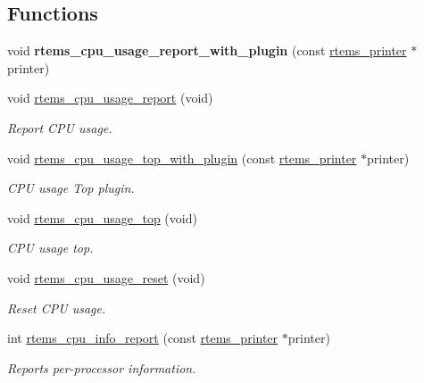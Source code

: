 \subsection*{Functions}
\begin{DoxyCompactItemize}
\item 
\mbox{\label{group__libmisc__cpuuse_ga848ef3a820832a30320d3fe4ab710e3d}} 
void {\bfseries rtems\+\_\+cpu\+\_\+usage\+\_\+report\+\_\+with\+\_\+plugin} (const \mbox{\hyperlink{structrtems__printer}{rtems\+\_\+printer}} $\ast$printer)
\item 
void \mbox{\hyperlink{group__libmisc__cpuuse_gadb8847280947582f897b8b544dee213f}{rtems\+\_\+cpu\+\_\+usage\+\_\+report}} (void)
\begin{DoxyCompactList}\small\item\em Report C\+PU usage. \end{DoxyCompactList}\item 
void \mbox{\hyperlink{group__libmisc__cpuuse_gacd408d05bbbb31991311a6b90ef0b0a8}{rtems\+\_\+cpu\+\_\+usage\+\_\+top\+\_\+with\+\_\+plugin}} (const \mbox{\hyperlink{structrtems__printer}{rtems\+\_\+printer}} $\ast$printer)
\begin{DoxyCompactList}\small\item\em C\+PU usage Top plugin. \end{DoxyCompactList}\item 
void \mbox{\hyperlink{group__libmisc__cpuuse_ga19ebbbc28253558959a17de6992d0ef2}{rtems\+\_\+cpu\+\_\+usage\+\_\+top}} (void)
\begin{DoxyCompactList}\small\item\em C\+PU usage top. \end{DoxyCompactList}\item 
void \mbox{\hyperlink{group__libmisc__cpuuse_gac38d4e3385e0c7307035d828e74ace97}{rtems\+\_\+cpu\+\_\+usage\+\_\+reset}} (void)
\begin{DoxyCompactList}\small\item\em Reset C\+PU usage. \end{DoxyCompactList}\item 
int \mbox{\hyperlink{group__libmisc__cpuuse_gaf6abf25be4a36f4f36e44b9b5bedb6d5}{rtems\+\_\+cpu\+\_\+info\+\_\+report}} (const \mbox{\hyperlink{structrtems__printer}{rtems\+\_\+printer}} $\ast$printer)
\begin{DoxyCompactList}\small\item\em Reports per-\/processor information. \end{DoxyCompactList}\end{DoxyCompactItemize}


